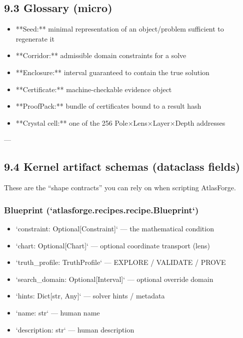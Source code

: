 \documentclass[11pt]{article}
\begin{document}
\subsection{9.3 Glossary (micro)}

\begin{itemize}
\item **Seed:** minimal representation of an object/problem sufficient to regenerate it
\item **Corridor:** admissible domain constraints for a solve
\item **Enclosure:** interval guaranteed to contain the true solution
\item **Certificate:** machine-checkable evidence object
\item **ProofPack:** bundle of certificates bound to a result hash
\item **Crystal cell:** one of the 256 Pole×Lens×Layer×Depth addresses
\end{itemize}

---



\subsection{9.4 Kernel artifact schemas (dataclass fields)}

These are the “shape contracts” you can rely on when scripting AtlasForge.

\subsubsection{Blueprint (`atlasforge.recipes.recipe.Blueprint`)}
\begin{itemize}
\item `constraint: Optional[Constraint]` — the mathematical condition
\item `chart: Optional[Chart]` — optional coordinate transport (lens)
\item `truth\_profile: TruthProfile` — EXPLORE / VALIDATE / PROVE
\item `search\_domain: Optional[Interval]` — optional override domain
\item `hints: Dict[str, Any]` — solver hints / metadata
\item `name: str` — human name
\item `description: str` — human description
\end{itemize}
\end{document}
